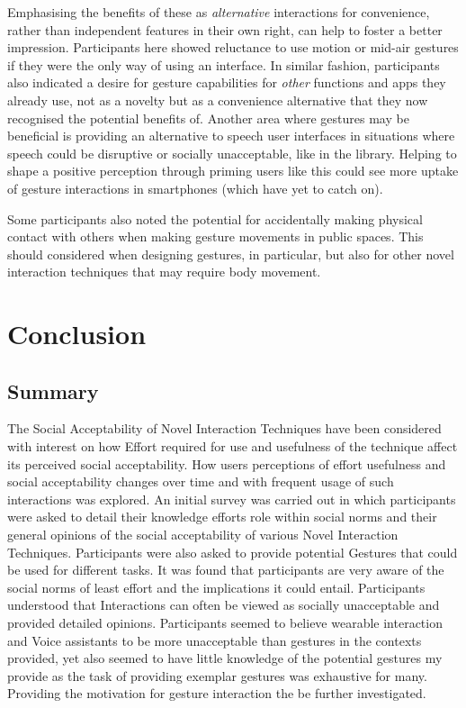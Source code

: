 \documentclass{l4proj}
\begin{document}
Emphasising the benefits of these as \textit{alternative} interactions for convenience, rather than independent features in their own right, can help to foster a better impression. Participants here showed reluctance to use motion or mid-air gestures if they were the only way of using an interface. In similar fashion, participants also indicated a desire for gesture capabilities for \textit{other} functions and apps they already use, not as a novelty but as a convenience alternative that they now recognised the potential benefits of. Another area where gestures may be beneficial is providing an alternative to speech user interfaces in situations where speech could be disruptive or socially unacceptable, like in the library. Helping to shape a positive perception through priming users like this could see more uptake of gesture interactions in smartphones (which have yet to catch on).

Some participants also noted the potential for accidentally making physical contact with others when making gesture movements in public spaces. This should considered when designing gestures, in particular, but also for other novel interaction techniques that may require body movement.


\chapter{Conclusion}  


\section{Summary}
The Social Acceptability of Novel Interaction Techniques have been considered with interest on how Effort required for use and usefulness of the technique affect its perceived social acceptability. How users perceptions of effort usefulness and social acceptability changes over time and with frequent usage of such interactions was explored. An initial survey was carried out in which participants were asked to detail their knowledge efforts role within social norms and their general opinions of the social acceptability of various Novel Interaction Techniques. Participants were also asked to provide potential Gestures that could be used for different tasks. It was found that participants are very aware of the social norms of least effort and the implications it could entail. Participants understood that Interactions can often be viewed as socially unacceptable and provided detailed opinions. Participants seemed to believe wearable interaction and Voice assistants to be more unacceptable than gestures in the contexts provided, yet also seemed to have little knowledge of the potential gestures my provide as the task of providing exemplar gestures was exhaustive for many. Providing the motivation for gesture interaction the be further investigated.
\end{document}
